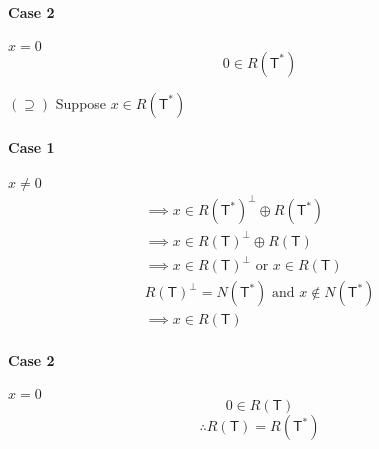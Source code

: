 \paragraph{Case 2} $x=0$
\begin{equation}
0 \in R(\mathsf{T^*})
\end{equation}

$(\supseteq)$ Suppose $x \in R(\mathsf{T}^*)$
\paragraph{Case 1} $x \neq 0$
\begin{gather}
\implies x \in R(\mathsf{T}^*)^\perp \oplus R(\mathsf{T}^*)\\
\implies x \in R(\mathsf{T})^\perp \oplus R(\mathsf{T})\\
\implies x \in R(\mathsf{T})^\perp \text{ or } x \in R(\mathsf{T})\\
R(\mathsf{T})^\perp = N(\mathsf{T}^*) \text{ and } x \notin
N(\mathsf{T}^*)\\
\implies x \in R(\mathsf{T})
\end{gather}
\paragraph{Case 2} $x = 0$
\begin{equation}
0 \in R(\mathsf{T})
\end{equation}
\begin{equation}
\therefore R(\mathsf{T}) = R(\mathsf{T}^*)
\end{equation}
